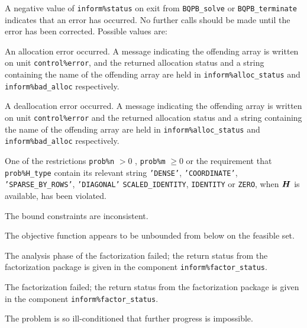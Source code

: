 \documentclass{galahad}
\newcommand{\packagename}{BQPB}
\begin{document}

\galerrors
A negative value of {\tt inform\%status} on exit from
{\tt \packagename\_solve}
or
{\tt \packagename\_terminate}
indicates that an error has occurred. No further calls should be made
until the error has been corrected. Possible values are:

\begin{description}

 An allocation error occurred. A message indicating
the offending
array is written on unit {\tt control\%error}, and the returned allocation
status and a string containing the name of the offending array
are held in {\tt inform\%alloc\_\-status}
and {\tt inform\%bad\_alloc} respectively.

 A deallocation error occurred.
A message indicating the offending
array is written on unit {\tt control\%error} and the returned allocation
status and a string containing the name of the offending array
are held in {\tt inform\%alloc\_\-status}
and {\tt inform\%bad\_alloc} respectively.

 One of the restrictions
 {\tt prob\%n} $> 0$ ,  {\tt prob\%m} $\geq 0$
    or the requirement that
    {\tt prob\%H\_type} contain its relevant string
    {\tt 'DENSE'}, {\tt 'COORDINATE'}, {\tt 'SPARSE\_BY\_ROWS'},
    {\tt 'DIAGONAL'}  {\tt SCALED\_IDENTITY}, {\tt IDENTITY} or {\tt ZERO},
    when ${\bm{H}}$ is available, has been violated.


 The bound constraints are inconsistent.

 The objective function appears to be unbounded
  from below on the feasible set.

 The analysis phase of the factorization failed;
  the return status from the factorization
    package is given in the component {\tt inform\%fac\-t\-or\_status}.

 The factorization failed; the return status
  from the factorization
    package is given in the component {\tt inform\%fac\-t\-or\_status}.

 The problem is so ill-conditioned that
 further progress is impossible.


\end{description}
\end{document}
